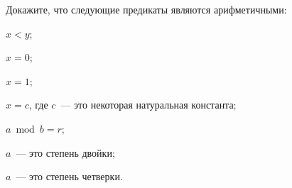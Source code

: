 Докажите, что следующие предикаты являются арифметичными:
\begin{enumcyr}
    \item $x < y$;
    \item $x = 0$;
    \item $x = 1$;
    \item $x = c$, где $c$~--- это некоторая натуральная константа;
    \item $a \bmod b = r$;
    \item $a$~--- это степень двойки;
    \item $a$~--- это степень четверки.
\end{enumcyr}